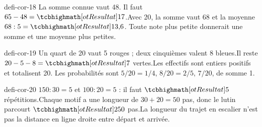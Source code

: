 \begin{blocEdition}{defi-cor-18}
La somme connue vaut 48. Il faut $65-48=\res{17}$.Avec 20, la somme vaut 68 et la moyenne $68:5=\res{13{,}6}$. Toute note plus petite donnerait une somme et une moyenne plus petites.
\end{blocEdition}
\begin{blocEdition}{defi-cor-19}
Un quart de 20 vaut 5 rouges ; deux cinquièmes valent 8 bleues.Il reste $20-5-8=\res7$ vertes.Les effectifs sont entiers positifs et totalisent 20. Les probabilités sont $5/20=1/4$, $8/20=2/5$, $7/20$, de somme 1.
\end{blocEdition}
\begin{blocEdition}{defi-cor-20}
$150:30=5$ et $100:20=5$ : il faut $\res5$ répétitions.Chaque motif a une longueur de $30+20=50$ pas, donc le lutin parcourt $\res{250}$ pas.La longueur du trajet en escalier n’est pas la distance en ligne droite entre départ et arrivée.\label{fig-defi-cor-20}

\end{blocEdition}
